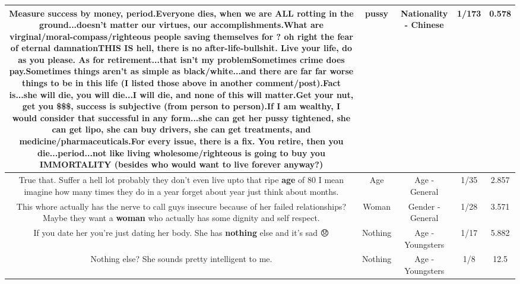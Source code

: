 \documentclass[11pt]{article}
\newlength\mylength
\begin{document}
\begin{center}
\begin{longtable}{|C{.65\mylength}|C{.30\mylength}|C{.12\mylength}|C{.12\mylength}|C{.12\mylength}|}
  \small Measure success by money, period.Everyone dies, when we are ALL rotting in the ground...doesn't matter our virtues, our accomplishments.What are virginal/moral-compass/righteous people saving themselves for ? oh right the fear of eternal damnationTHIS IS hell, there is no after-life-bullshit.  Live your life, do as you please.  As for retirement...that isn't my problemSometimes crime does pay.Sometimes things aren't as simple as black/white...and there are far far worse things to be in this life (I listed those above in another comment/post).Fact is...she will die, you will die...I will die, and none of this will matter.Get your nut, get you \$\$\$, success is subjective (from person to person).If I am wealthy, I would consider that successful in any form...she can get her \textbf{pussy} tightened, she can get lipo, she can buy drivers, she can get treatments, and medicine/pharmaceuticals.For every issue, there is a fix.  You retire, then you die...period...not like living wholesome/righteous is going to buy you IMMORTALITY (besides who would want to live forever anyway?)\normalsize   & pussy & Nationality - Chinese & 1/173 & 0.578 \\  \hline
  \small True that. Suffer a hell lot probably they don't even live upto that ripe \textbf{age} of 80 I mean imagine how many times they do in a year forget about year just think about months.\normalsize   & Age & Age - General & 1/35 & 2.857 \\  \hline
  \small This whore actually has the nerve to call guys insecure because of her failed relationships? Maybe they want a \textbf{woman} who actually has some dignity and self respect.\normalsize   & Woman & Gender - General & 1/28 & 3.571 \\  \hline
  \small If you date her you're just dating her body. She has \textbf{nothing} else and it's sad 😞\normalsize   & Nothing & Age - Youngsters & 1/17 & 5.882 \\  \hline
  \small Nothing else? She sounds pretty intelligent to me.\normalsize   & Nothing & Age - Youngsters & 1/8 & 12.5 \\  \hline

\end{longtable}
\end{center}
\end{document}
